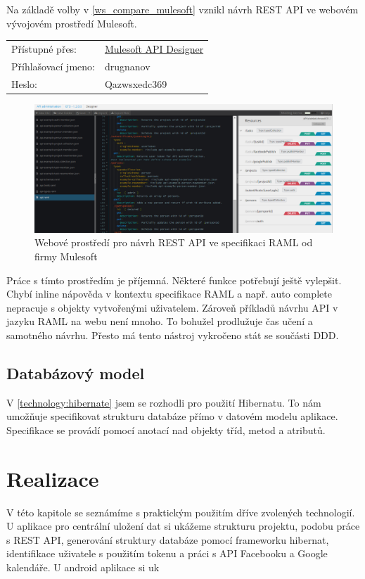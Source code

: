 \documentclass[thesis=B,czech]{FITthesis}[2012/06/26]
\begin{document}
Na základě volby v \ref{ws_compare_mulesoft} vznikl návrh REST API ve webovém vývojovém prostředí Mulesoft.\newline 

\begin{tabular}{l l}
	Přístupné přes:&\href{''https://anypoint.mulesoft.com/#/signin''}{Mulesoft API Designer}\\
	Příhlašovací jmeno:&drugnanov\\
	Heslo:&Qazwsxedc369\\
\end{tabular}

\begin{figure}[h!]\centering
	\includegraphics[width=1\textwidth]{pictures/gtd_raml_anypoint}
	\caption{Webové prostředí pro návrh REST API ve specifikaci RAML od firmy Mulesoft}\label{fig:gtd_raml_ide}
\end{figure}

Práce s tímto prostředím je příjemná. Některé funkce potřebují ještě vylepšit. Chybí inline nápověda v kontextu specifikace RAML a např. auto complete nepracuje s objekty vytvořenými uživatelem. Zároveň příkladů návrhu API v jazyku RAML na webu není mnoho. To bohužel prodlužuje čas učení a samotného návrhu. Přesto má tento nástroj vykročeno stát se součásti DDD\cite{ws_raml_ddd}. 

\section{Databázový model}
\label{design:database_model}
V \ref{technology:hibernate} jsem se rozhodli pro použití Hibernatu. To nám umožňuje specifikovat strukturu databáze přímo v datovém modelu aplikace. Specifikace se provádí pomocí anotací nad objekty tříd, metod a atributů\cite{design_hibernate_annotations}. 


\chapter{Realizace}
V této kapitole se seznámíme s praktickým použitím dříve zvolených technologií. U aplikace pro centrální uložení dat si ukážeme strukturu projektu, podobu práce s REST API, generování struktury databáze pomocí frameworku hibernat, identifikace uživatele s použitím tokenu a práci s API Facebooku a Google kalendáře.
U android aplikace si uk
\newpage
\end{document}
